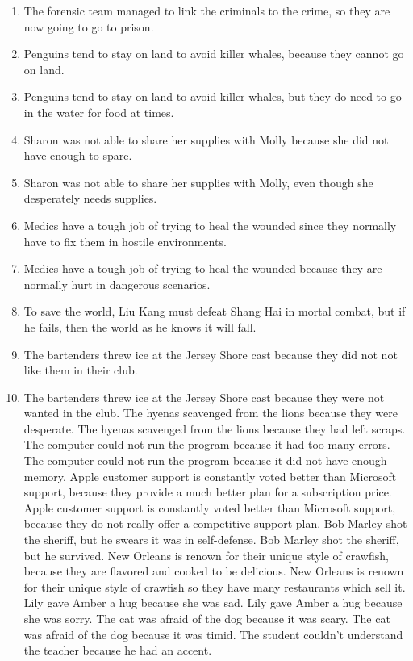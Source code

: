 \documentclass{article}
\begin{document}
\begin{enumerate}
	\item The forensic team managed to link the criminals to the crime, so they are now going to go to prison.
	\item Penguins tend to stay on land to avoid killer whales, because they cannot go on land.
	\item Penguins tend to stay on land to avoid killer whales, but they do need to go in the water for food at times.
	\item Sharon was not able to share her supplies with Molly because she did not have enough to spare.
	\item Sharon was not able to share her supplies with Molly, even though she desperately needs supplies.
	\item Medics have a tough job of trying to heal the wounded since they normally have to fix them in hostile environments.
	\item Medics have a tough job of trying to heal the wounded because they are normally hurt in dangerous scenarios.
	\item To save the world, Liu Kang must defeat Shang Hai in mortal combat, but if he fails, then the world as he knows it will fall.
	\item The bartenders threw ice at the Jersey Shore cast because they did not not like them in their club.
	\item The bartenders threw ice at the Jersey Shore cast because they were not wanted in the club.
	The hyenas scavenged from the lions because they were desperate.
	The hyenas scavenged from the lions because they had left scraps.
	The computer could not run the program because it had too many errors.
	The computer could not run the program because it did not have enough memory.
	Apple customer support is constantly voted better than Microsoft support, because they provide a much better plan for a subscription price.
	Apple customer support is constantly voted better than Microsoft support, because they do not really offer a competitive support plan.
	Bob Marley shot the sheriff, but he swears it was in self-defense.
	Bob Marley shot the sheriff, but he survived.
	New Orleans is renown for their unique style of crawfish, because they are flavored and cooked to be delicious.
	New Orleans is renown for their unique style of crawfish so they have many restaurants which sell it.
	Lily gave Amber a hug because she was sad.
	Lily gave Amber a hug because she was sorry.
	The cat was afraid of the dog because it was scary.
	The cat was afraid of the dog because it was timid.
	The student couldn't understand the teacher because he had an accent.

\end{enumerate}
\end{document}

